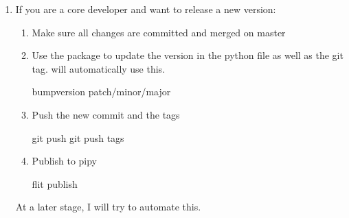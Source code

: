\documentclass[letterpaper,10pt,english]{sphinxmanual}
\begin{document}
\begin{enumerate}
And starting the automatic build process in the projects root folder

\begin{sphinxVerbatim}[commandchars=\\\{\}]
sphinx\PYGZhy{}autobuild docs build
\end{sphinxVerbatim}

The autobuild will rebuild the project whenever you change something. It displays a URL where to find
the created docs now (most likely ).
Please make sure the documentation looks fine before creating a pull request.

\item {} 
If you are a core developer and want to release a new version:
\begin{enumerate}
%
\item {} 
Make sure all changes are committed and merged on master

\item {} 
Use the  package to update the version in the python file  as well
as the git tag.  will automatically use this.

\begin{sphinxVerbatim}[commandchars=\\\{\}]
bumpversion patch/minor/major
\end{sphinxVerbatim}

\item {} 
Push the new commit and the tags

\begin{sphinxVerbatim}[commandchars=\\\{\}]
git push
git push \PYGZhy{}\PYGZhy{}tags
\end{sphinxVerbatim}

\item {} 
Publish to pipy

\begin{sphinxVerbatim}[commandchars=\\\{\}]
flit publish
\end{sphinxVerbatim}

\end{enumerate}

At a later stage, I will try to automate this.

\end{enumerate}
\end{document}
